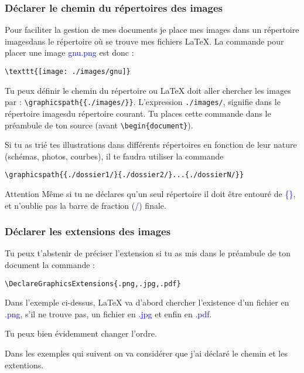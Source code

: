 \documentclass[10pt,hyperref={pdfpagemode=FullScreen},xcolor=dvipsnames,xcolor=table, xcolor=svgnames]{beamer}%
\newcommand{\latex}{\LaTeX\xspace}
\begin{document}
 \begin{frame}[fragile]
   \frametitle{Déclarer le chemin du répertoires des images}
Pour faciliter la gestion de mes documents je place mes images dans un répertoire \og images\fg dans le répertoire où se trouve mes fichiers \latex. La commande pour placer une image \textcolor{blue}{gnu.png} est donc :
\begin{exampleblock}{}
\verb"\texttt{[image: ./images/gnu]}"
\end{exampleblock}
Tu peux définir le chemin du répertoire ou \latex doit aller chercher les images par :
{\color{blue}\verb"\graphicspath{{./images/}}"}. L'expression {\color{blue}\verb"./images/"}, signifie dans le répertoire \og images\fg du répertoire courant. Tu places cette commande dans le préambule de ton source (avant {\color{blue}\verb"\begin{document}"}).\par
Si tu as trié tes illustrations dans différents répertoires en fonction de leur nature (schémas, photos, courbes), il te faudra utiliser la commande 
\begin{exampleblock}{}
\verb"\graphicspath{{./dossier1/}{./dossier2/}...{./dossierN/}}"
\end{exampleblock}
\begin{alertblock}{Attention}
Même si tu ne déclares qu'un seul répertoire il doit être entouré de \textcolor{blue}{\{\}}, et n'oublie pas la barre de fraction (\textcolor{blue}{/}) finale.
\end{alertblock}
\end{frame}
 \begin{frame}[fragile]
   \frametitle{Déclarer les extensions des images}
Tu peux t'abstenir de préciser l'extension si tu as mis dans le préambule de ton document la commande : 
\begin{exampleblock}{}
\verb"\DeclareGraphicsExtensions{.png,.jpg,.pdf}"
\end{exampleblock}
 Dans l'exemple ci-dessus, \latex  va d'abord chercher l'existence d'un fichier en  \textcolor{blue}{.png}, s'il ne trouve pas, un fichier en  \textcolor{blue}{.jpg} et enfin en \textcolor{blue}{.pdf}.\par Tu peux bien évidemment changer l'ordre.
 \par
 Dans les exemples qui suivent on va considérer que j'ai déclaré le chemin et les extentions.
\end{frame}
\end{document}
